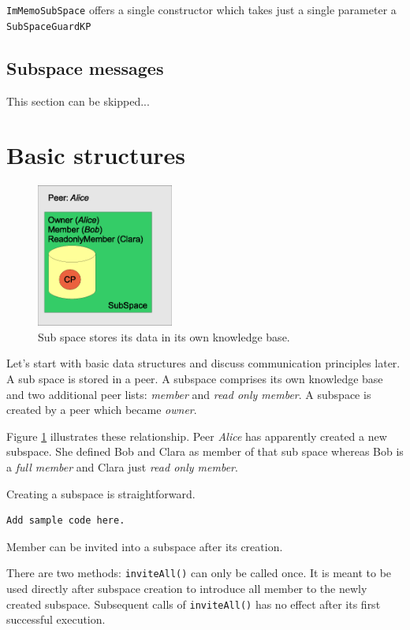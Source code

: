 {\tt ImMemoSubSpace} offers a single constructor which takes just a single parameter a {\tt SubSpaceGuardKP}

\subsection{Subspace messages}
\label{subspacemessages}
This section can be skipped...


\section{Basic structures}
\begin{figure}[t]
\centering
\includegraphics[width=0.40\textwidth]{subspace.eps}
\caption{Sub space stores its data in its own knowledge base.}
\label{fig:subspace}
\end{figure}

Let's start with basic data structures and discuss communication principles later. A sub space is stored in a peer. A subspace comprises its own knowledge base and two additional peer lists: {\it member} and {\it read only member}.
A subspace is created by a peer which became {\it owner}.

Figure \ref{fig:subspace} illustrates these relationship. Peer {\it Alice} has apparently created a new subspace. She defined Bob and Clara as member of that sub space whereas Bob is a {\it full member} and Clara just {\it read only member}.

Creating a subspace is straightforward.
\begin{verbatim}
Add sample code here.
\end{verbatim}

Member can be invited into a subspace after its creation.

There are two methods: {\verb|inviteAll()|} can only be called once. It is meant to be used directly after subspace creation to introduce all member to the newly created subspace. Subsequent calls of {\verb|inviteAll()|} has no effect after its first successful execution.

